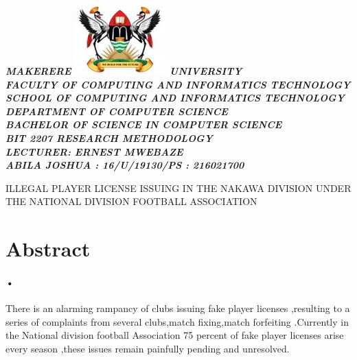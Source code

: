 \documentclass[12pt]{article}
\begin{document}
\begin{center}
\begin{normalsize}
\textbf\sl{MAKERERE \includegraphics[scale=0.5]{logo} UNIVERSITY }\\


\textbf\sl{FACULTY OF COMPUTING AND INFORMATICS TECHNOLOGY} \\
\textbf\sl{SCHOOL OF COMPUTING AND INFORMATICS TECHNOLOGY} \\
\textbf\sl{DEPARTMENT OF COMPUTER SCIENCE} \\
\textbf\sl{BACHELOR OF SCIENCE IN COMPUTER SCIENCE} \\
\textbf\sl{BIT 2207 RESEARCH METHODOLOGY} \\
\textbf\sl{LECTURER: ERNEST MWEBAZE} \\


\textbf{ABILA JOSHUA : 16/U/19130/PS : 216021700}\\



\end{normalsize}
\end{center}



\newpage

\begin{center}
\textsc{ILLEGAL PLAYER LICENSE ISSUING IN THE NAKAWA DIVISION UNDER THE  NATIONAL DIVISION FOOTBALL ASSOCIATION }\\


\end{center}

\section{Abstract}
\paragraph{•}
There is an alarming rampancy of clubs issuing fake player licenses ,resulting to a series of complaints from several clubs,match fixing,match forfeiting .Currently in the National division football Association 75 percent of fake player licenses  arise every season ,these issues remain painfully pending and unresolved.
\end{document}
